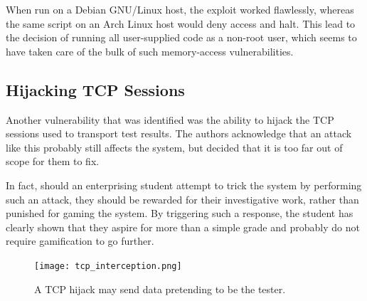 When run on a Debian GNU/Linux host, the exploit worked flawlessly, whereas the same script on an Arch Linux host would deny access and halt. This lead to the decision of running all user-supplied code as a non-root user, which seems to have taken care of the bulk of such memory-access vulnerabilities.

\subsection{Hijacking TCP Sessions}
Another vulnerability that was identified was the ability to hijack the TCP sessions used to transport test results. The authors acknowledge that an attack like this probably still affects the system, but decided that it is too far out of scope for them to fix.

In fact, should an enterprising student attempt to trick the system by performing such an attack, they should be rewarded for their investigative work, rather than punished for gaming the system. By triggering such a response, the student has clearly shown that they aspire for more than a simple grade and probably do not require gamification to go further.
\begin{figure}
    \centering
    \texttt{[image: tcp\_interception.png]}
    \caption{A TCP hijack may send data pretending to be the tester.}
\end{figure}
